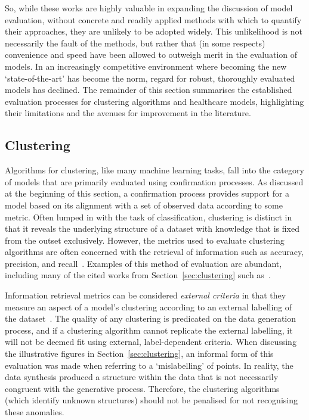So, while these works are highly valuable in expanding the discussion of model
evaluation, without concrete and readily applied methods with which to quantify
their approaches, they are unlikely to be adopted widely. This unlikelihood is
not necessarily the fault of the methods, but rather that (in some respects)
convenience and speed have been allowed to outweigh merit in the evaluation of
models. In an increasingly competitive environment where becoming the new
`state-of-the-art' has become the norm, regard for robust, thoroughly evaluated
models has declined. The remainder of this section summarises the established
evaluation processes for clustering algorithms and healthcare models,
highlighting their limitations and the avenues for improvement in the
literature.

\subsection{Clustering}\label{subsec:clustering_evaluation}

Algorithms for clustering, like many machine learning tasks, fall into the
category of models that are primarily evaluated using confirmation processes. As
discussed at the beginning of this section, a confirmation process provides
support for a model based on its
alignment with a set of observed data according to some metric. Often lumped in
with the task of classification, clustering is distinct in that it reveals the
underlying structure of a dataset with knowledge that is fixed from the outset
exclusively. However, the metrics used to evaluate clustering algorithms are
often concerned with the retrieval of information such as accuracy, precision,
and recall~\cite{Manning2008}. Examples of this method of evaluation are
abundant, including many of the cited works from Section~\ref{sec:clustering}
such as~\cite{Agrawal1998,Aljarah2019,Bakr2015,Cao2009,Huang1998}.

Information retrieval metrics can be considered \emph{external criteria} in that
they measure an aspect of a model's clustering according to an external labelling
of the dataset~\cite{Mitchell1997}. The quality of any
clustering is predicated on the data generation process, and if a clustering
algorithm cannot replicate the external labelling, it will not be deemed fit
using external, label-dependent criteria. When discussing the illustrative 
figures in Section~\ref{sec:clustering}, an informal form of this evaluation
was made when referring to a `mislabelling' of points. In reality, the data
synthesis produced a structure within the data that is not necessarily congruent
with the generative process. Therefore, the clustering algorithms (which
identify unknown structures) should not be penalised for not recognising these
anomalies.

